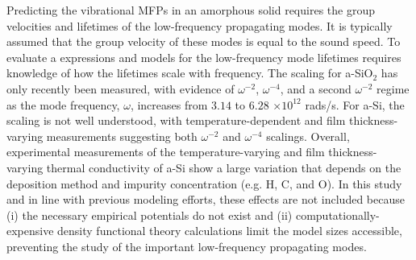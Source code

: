 \documentclass[aps,prb,twocolumn,superscriptaddress,footinbib,amsmath,amssymb,floatfix]{revtex4}
\begin{document}
Predicting the vibrational MFPs in an amorphous solid 
requires the group velocities and lifetimes 
of the low-frequency propagating modes.
\cite{freeman_thermal_1986,graebner_phonon_1986,
love_estimate_1990,feldman_thermal_1993,cahill_thermal_1994,
feldman_numerical_1999,zink_thermal_2006,baldi_thermal_2008,
liu_high_2009,yang_anomalously_2010,hondongwa_ultrasonic_2011} 
It is typically assumed that 
the group velocity of these modes is equal to the sound speed. 
To evaluate a expressions and models for the low-frequency 
mode lifetimes requires knowledge of how the lifetimes 
scale with frequency.
The scaling for a-SiO$_2$ has only recently been measured, 
with evidence of $\omega^{-2}$, $\omega^{-4}$, and a 
second $\omega^{-2}$ regime as the mode frequency, $\omega$, 
increases from $3.14$ to $6.28$ $\times 10^{12}$ rads/s.
\cite{masciovecchio_evidence_2006,
baldi_sound_2010,baldi_elastic_2011,baldi_emergence_2013} 
For a-Si, the scaling is not well understood, 
with temperature-dependent and film thickness-varying measurements
suggesting both $\omega^{-2}$ and $\omega^{-4}$ scalings.
\cite{pompe_thermal_1988,hasselman_thermal_1989,
kuo_thermal_1992,feldman_thermal_1993,cahill_thermal_1994,
wada_thermal_1996,feldman_numerical_1999,moon_thermal_2002,
zink_thermal_2006,zink_excess_2006,liu_high_2009,
yang_anomalously_2010,he_heat_2011,hondongwa_ultrasonic_2011} 
Overall, experimental measurements of the temperature-varying 
and film thickness-varying thermal conductivity of a-Si show a large 
variation that depends on the deposition method and impurity 
concentration (e.g. H, C, and O).
\cite{liu_high_2009,yang_anomalously_2010,vacher_attenuation_1980,
li_effect_2011} 
In this study and in line with previous modeling efforts, 
these effects are not included because (i) 
the necessary empirical potentials do not exist and (ii) 
computationally-expensive density functional theory calculations 
limit the model sizes accessible,
\cite{feldman_thermal_1993,feldman_numerical_1999,
bernstein_structural_2006,liu_high_2009,yang_anomalously_2010} 
preventing the study of the important low-frequency propagating 
modes.
\end{document}

